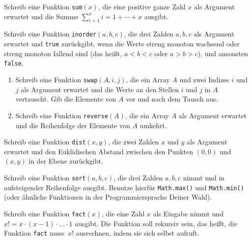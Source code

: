 \documentclass{uebung_cs}
\begin{document}
\begin{aufgabe}[Summe]
    Schreib eine Funktion \texttt{sum}$(x)$, die eine positive ganze Zahl $x$ als Argument erwartet und die Summe $\sum_{i=1}^x i = 1+\cdots+x$ ausgibt.
\end{aufgabe}

\begin{aufgabe}
    Schreib eine Funktion \texttt{inorder}$(a,b,c)$, die drei Zahlen $a,b,c$ als Argument erwartet und \texttt{true} zurückgibt, wenn die Werte streng monoton wachsend oder streng monoton fallend sind (das heißt, $a<b<c$ oder $a>b>c$), und ansonsten \texttt{false}.
\end{aufgabe}

\begin{aufgabe}\mbox{}
    \begin{enumerate}
        \item Schreib eine Funktion \texttt{swap}$(A,i,j)$, die ein Array $A$ und zwei Indizes $i$ und $j$ als Argument erwartet und die Werte an den Stellen $i$ und $j$ in $A$ vertauscht. Gib die Elemente von $A$ vor und nach dem Tausch aus.
        \item Schreib eine Funktion \texttt{reverse}$(A)$, die ein Array $A$ als Argument erwartet und die Reihenfolge der Elemente von $A$ umkehrt.
    \end{enumerate}
\end{aufgabe}

\begin{aufgabe}[Abstand]
    Schreib eine Funktion \texttt{dist}$(x,y)$, die zwei Zahlen $x$ und $y$ als Argument erwartet und den Euklidischen Abstand zwischen den Punkten $(0,0)$ und $(x,y)$ in der Ebene zurückgibt.
\end{aufgabe}

\begin{aufgabe}
    Schreib eine Funktion \texttt{sort}$(a,b,c)$, die drei Zahlen $a,b,c$ nimmt und in aufsteigender Reihenfolge ausgibt. Benutze hierfür \texttt{Math.max()} und \texttt{Math.min()} (oder ähnliche Funktionen in der Programmiersprache Deiner Wahl).
\end{aufgabe}

\begin{aufgabe}[Fakultät]
    Schreib eine Funktion \texttt{fact}$(x)$, die eine Zahl $x$ als Eingabe nimmt und $x!=x\cdot (x-1)\cdot\ldots\cdot 1$ ausgibt.
    Die Funktion soll rekursiv sein, das heißt, die Funktion \texttt{fact} muss~$x!$ ausrechnen, indem sie sich selbst aufruft.
\end{aufgabe}
\end{document}
